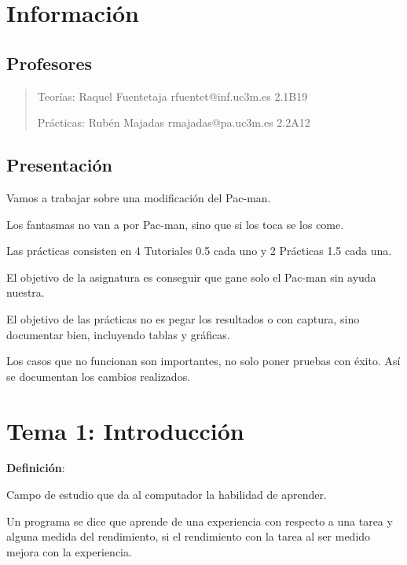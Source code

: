 \documentclass[12pt, twoside, openright]{report} %
\begin{document}
\listoffigures
\thispagestyle{fancy}



\chapter{Información}
\section{Profesores}

\begin{quote}
	Teorías: Raquel Fuentetaja rfuentet@inf.uc3m.es 2.1B19

	Prácticas: Rubén Majadas rmajadas@pa.uc3m.es 2.2A12
\end{quote}

\section{Presentación}

Vamos a trabajar sobre una modificación del Pac-man.

Los fantasmas no van a por Pac-man, sino que si los toca se los come.

Las prácticas consisten en 4 Tutoriales 0.5 cada uno y 2 Prácticas 1.5 cada una.

El objetivo de la asignatura es conseguir que gane solo el Pac-man sin ayuda nuestra.

El objetivo de las prácticas no es pegar los resultados o con captura, sino documentar bien, incluyendo tablas y gráficas.

Los casos que no funcionan son importantes, no solo poner pruebas con éxito. Así se documentan los cambios realizados.


\chapter{Tema 1: Introducción}

\textbf{Definición}:

Campo de estudio que da al computador la habilidad de aprender.

Un programa se dice que aprende de una experiencia con respecto a una tarea y alguna medida del rendimiento, si el rendimiento con la tarea al ser medido mejora con la experiencia.
\end{document}
